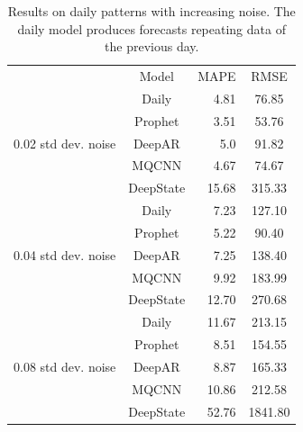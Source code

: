 \documentclass[a4paper, 12pt]{article} %
\newcommand{\ra}[1]{\renewcommand{\arraystretch}{#1}}
\begin{document}
	\begin{table}\centering 
		\ra{1.3}
		\begin{tabular}{@{}rcrc@{}}
			\cmidrule(l){1-4} %
			& Model & MAPE & RMSE\\
			\cmidrule(l){1-4} 
			\multirow{5}{*}{0.02 std dev. noise}
			& Daily & 4.81 & 76.85\\
			&Prophet & 3.51 & 53.76\\
			&DeepAR & 5.0 & 91.82\\
			&MQCNN & 4.67 & 74.67\\
			&DeepState & 15.68 & 315.33\\
			
			\cmidrule(l){1-4} 
			\multirow{5}{*}{0.04 std dev. noise}
			& Daily & 7.23 & 127.10\\
			&Prophet & 5.22 & 90.40\\
			&DeepAR & 7.25 & 138.40\\
			&MQCNN & 9.92 & 183.99\\
			&DeepState & 12.70 & 270.68\\
			
			\cmidrule(l){1-4} 
			\multirow{5}{*}{0.08 std dev. noise}
			& Daily & 11.67 & 213.15\\
			&Prophet & 8.51 & 154.55\\
			&DeepAR & 8.87 & 165.33\\
			&MQCNN & 10.86 & 212.58\\
			&DeepState & 52.76 & 1841.80\\
			\bottomrule
		\end{tabular}
		\caption{Results on daily patterns with increasing noise. The daily model produces forecasts repeating data of the previous day.} \label{table:results_forecasting_daily_patterns}
	\end{table}
	
\end{document}
